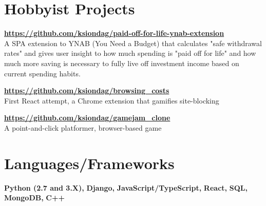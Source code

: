 \documentclass{res}
\begin{document}
\begin{resume}
  \vspace{0.1in}
  
  
  \section{Hobbyist Projects}
   {\bf \url{https://github.com/ksiondag/paid-off-for-life-ynab-extension}}\\
  A SPA extension to YNAB (You Need a Budget) that calculates "safe withdrawal rates" and gives user insight to how
  much spending is "paid off for life" and how much more saving is necessary to fully live off investment income based on
  current spending habits.
  
  \vspace{-5pt}
  {\bf \url{https://github.com/ksiondag/browsing_costs}}\\
  First React attempt, a Chrome extension that gamifies site-blocking
  
  \vspace{-5pt}
  {\bf \url{https://github.com/ksiondag/gamejam_clone}}\\
  A point-and-click platformer, browser-based game
  
  
  
  \section{Languages/Frameworks}
  \vspace{0.1in}
  {\bf Python (2.7 and 3.X),}
  {\bf Django,}
  {\bf JavaScript/TypeScript,}
  {\bf React,}
  {\bf SQL,}
  {\bf MongoDB,}
  {\bf C++}
  
\end{resume}
\end{document}
